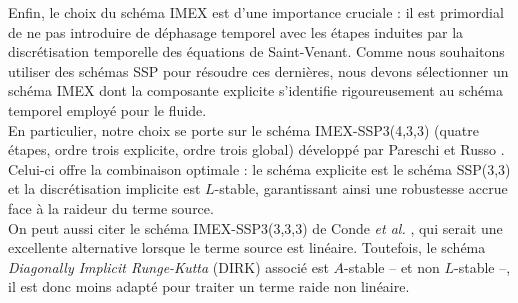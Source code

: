 \documentclass[11pt, a4paper, oneside]{report}
\begin{document}
\begin{samepage}
Enfin, le choix du schéma IMEX est d'une importance cruciale : il est primordial de ne pas introduire de déphasage temporel avec les étapes induites par la discrétisation temporelle des équations de Saint-Venant. Comme nous souhaitons utiliser des schémas SSP pour résoudre ces dernières, nous devons sélectionner un schéma IMEX dont la composante explicite s'identifie rigoureusement au schéma temporel employé pour le fluide. \\
En particulier, notre choix se porte sur le schéma IMEX-SSP3(4,3,3) (quatre étapes, ordre trois explicite, ordre trois global) développé par Pareschi et Russo \cite{pareschi2005implicit}. Celui-ci offre la combinaison optimale : le schéma explicite est le schéma SSP(3,3) et la discrétisation implicite est $L$-stable, garantissant ainsi une robustesse accrue face à la raideur du terme source. \\
On peut aussi citer le schéma IMEX-SSP3(3,3,3) de Conde \textit{et al.} \cite{conde2017implicit}, qui serait une excellente alternative lorsque le terme source est linéaire. Toutefois, le schéma \textit{Diagonally Implicit Runge-Kutta} (DIRK) associé est $A$-stable -- et non $L$-stable --, il est donc moins adapté pour traiter un terme raide non linéaire. \\
\end{samepage}
\end{document}
